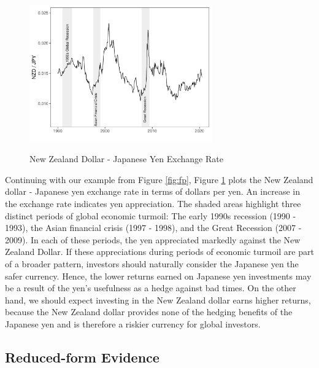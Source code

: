 \documentclass{ar-1col}
\begin{document}
\begin{figure}[htp!]
  \centering
  \caption{New Zealand Dollar - Japanese Yen Exchange Rate}
  \includegraphics[width=0.7\textwidth]{Exhibits/Figure_FX_JPYNZD.pdf}
  \label{fig:spot}
\end{figure}
Continuing with our example from Figure \ref{fig:fp}, Figure
\ref{fig:spot} plots the New Zealand dollar - Japanese yen exchange
rate in terms of dollars per yen. An increase in the exchange rate
indicates yen appreciation. The shaded areas highlight three distinct
periods of global economic turmoil: The early 1990s recession (1990 -
1993), the Asian financial crisis (1997 - 1998), and the Great
Recession (2007 - 2009). In each of these periods, the yen appreciated
markedly against the New Zealand Dollar. If these appreciations during
periods of economic turmoil are part of a broader pattern, investors
should naturally consider the Japanese yen the safer currency. Hence,
the lower returns earned on Japanese yen investments may be a result
of the yen's usefulness as a hedge against bad times. On the other
hand, we should expect investing in the New Zealand dollar earns
higher returns, because the New Zealand dollar provides none of the
hedging benefits of the Japanese yen and is therefore a riskier
currency for global investors.

\subsection{Reduced-form Evidence}
\end{document}
